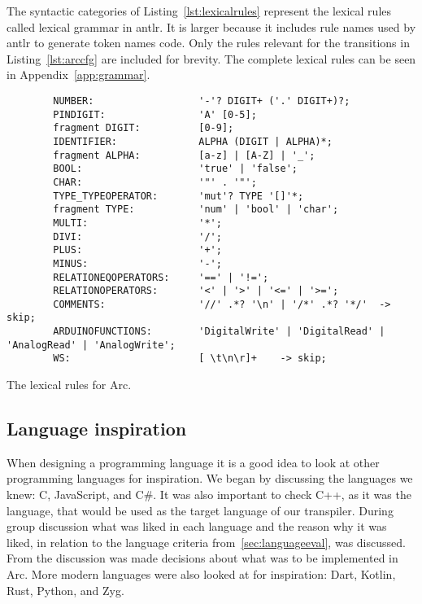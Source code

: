 The syntactic categories of Listing~\ref{lst:lexicalrules} represent the lexical rules called lexical grammar in \gls{antlr}. It is larger because it includes rule names used by \gls{antlr} to generate token names code. Only the rules relevant for the transitions in Listing~\ref{lst:arccfg} are included for brevity. The complete lexical rules can be seen in Appendix~\ref{app:grammar}.


\begin{listing}[htb!]
    \begin{verbatim}
        NUMBER:                  '-'? DIGIT+ ('.' DIGIT+)?;
        PINDIGIT:                'A' [0-5];
        fragment DIGIT:          [0-9];
        IDENTIFIER:              ALPHA (DIGIT | ALPHA)*;
        fragment ALPHA:          [a-z] | [A-Z] | '_';
        BOOL:                    'true' | 'false';
        CHAR:                    '"' . '"';
        TYPE_TYPEOPERATOR:       'mut'? TYPE '[]'*;
        fragment TYPE:           'num' | 'bool' | 'char';
        MULTI:                   '*';
        DIVI:                    '/';
        PLUS:                    '+';
        MINUS:                   '-';
        RELATIONEQOPERATORS:     '==' | '!=';
        RELATIONOPERATORS:       '<' | '>' | '<=' | '>=';
        COMMENTS:                '//' .*? '\n' | '/*' .*? '*/'  -> skip;
        ARDUINOFUNCTIONS:        'DigitalWrite' | 'DigitalRead' | 'AnalogRead' | 'AnalogWrite';
        WS:                      [ \t\n\r]+    -> skip;
    \end{verbatim}
    \caption{The lexical rules for Arc.}
    \label{lst:lexicalrules}
\end{listing}


\subsection{Language inspiration}\label{sec:inspiration}
When designing a programming language it is a good idea to look at other programming languages for inspiration. We began by discussing the languages we knew: C, JavaScript, and C\#. It was also important to check C++, as it was the language, that would be used as the target language of our transpiler. During group discussion what was liked in each language and the reason why it was liked, in relation to the language criteria from~\ref{sec:languageeval}, was discussed. From the discussion was made decisions about what was to be implemented in Arc. More modern languages were also looked at for inspiration: Dart, Kotlin, Rust, Python, and Zyg.


